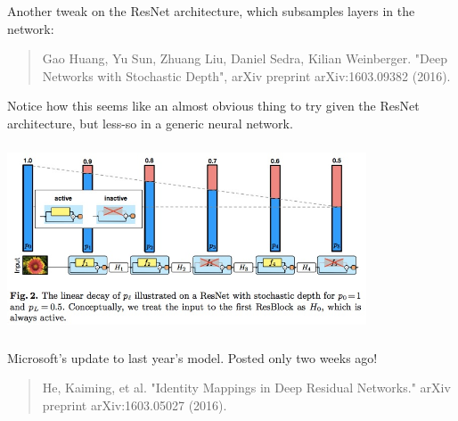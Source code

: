 \documentclass[xetex,mathserif,serif,aspectratio=169]{beamer}
\begin{document}
\begin{frame}[fragile] \frametitle{} \oldB \small

\textbf{}

\end{frame}

\begin{frame}[fragile] \frametitle{} \oldB \small


Another tweak on the ResNet architecture, which subsamples
layers in the network:
\begin{quote}
Gao Huang, Yu Sun, Zhuang Liu, Daniel Sedra, Kilian Weinberger.
"Deep Networks with Stochastic Depth", arXiv preprint arXiv:1603.09382 (2016).
\end{quote}
Notice how this seems like an almost obvious thing to try
given the ResNet architecture, but less-so in a generic
neural network.

\end{frame}

\begin{frame}[fragile] \frametitle{} \oldB \small

\begin{center}
\includegraphics[width=0.8\textwidth]{img/sampleNet.jpg}
\end{center}

\end{frame}

\begin{frame}[fragile] \frametitle{} \oldB \small


Microsoft's update to last year's model. Posted only two
weeks ago!
\begin{quote}
He, Kaiming, et al. "Identity Mappings in Deep Residual Networks." arXiv preprint arXiv:1603.05027 (2016).
\end{quote}

\end{frame}
\end{document}
